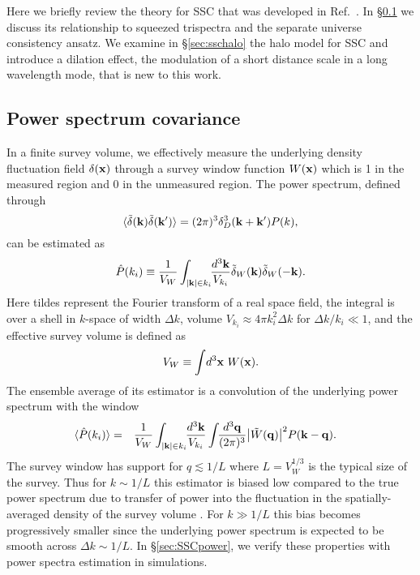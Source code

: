 \documentclass[prd,twocolumn,amsmath,amssymb,floatfix,superscriptaddress]{revtex4-1}
\newcommand{\bx}{{\bf x}}
\newcommand{\bk}{{\bf k}}
\newcommand{\bq}{{\bf q}}
\begin{document}
Here we briefly review the theory for SSC that was
developed in Ref.~\cite{Takada:2013wfa}.   In \S \ref{sec:ssctri} we discuss its relationship
to squeezed trispectra and the separate universe consistency ansatz.  We examine in \S \ref{sec:sschalo} the halo model for SSC and introduce a dilation effect, the modulation of  
a short distance scale in a long wavelength mode, that is new to this work.



\subsection{Power spectrum covariance}
\label{sec:ssctri}

In a finite survey volume, we effectively measure 
 the underlying density fluctuation field $\delta(\bx)$
through a survey window function $W(\bx)$ which is 1 in the measured
region and 0 in the unmeasured region.  
The power spectrum, defined through
\begin{equation}
\langle \tilde \delta(\bk ) \tilde \delta(\bk') \rangle = (2\pi)^3 \delta_D^3(\bk+\bk') P(k),
\end{equation}
can be estimated 
as
\begin{equation}
\hat P(k_i) \equiv \frac{1}{V_W} \int_{|\bk|\in k_i}\!\! \frac{d^3
 \bk}{V_{k_i}} 
\tilde\delta_W(\bk)\tilde\delta_W(-\bk).
\label{eq:ps_est}
\end{equation}
Here  tildes represent the Fourier transform of a real space field,
the integral is over a shell in $k$-space of width $\Delta k$,
volume $V_{k_i}\approx 4\pi k_i^2 \Delta k$ for $\Delta k /k_i \ll 1$, and
 the effective survey volume is defined as
%
\begin{equation}
 V_W\equiv \int\!d^3\bx~W(\bx).
\end{equation}
The ensemble average of its estimator is a convolution of the underlying power spectrum 
with the window
%
\begin{eqnarray}
\!\!\!\!\!\!
\langle \hat P(k_i) \rangle &=& \frac{1}{V_W}   \int_{|\bk|\in 
k_i}\!\! \frac{d^3 \bk}{V_{k_i}}  \int\!\! \frac{d^3 \bq}{(2\pi)^3}  
\big|\tilde{W}(\bq)\big|^2 P(\bk-\bq).
\label{eqn:Pwindowed}
\end{eqnarray}
%
The survey window has support for $q \lesssim 1/L$ where $L = V_W^{1/3}$ is the typical
size of the survey.   Thus
for $k \sim 1/L$ this estimator is biased low compared to the true power spectrum
due to transfer of power into the fluctuation in the spatially-averaged density of
the survey volume {\citep{Takahashietal:09}}.    For $k \gg 1/L$ this
bias becomes progressively smaller since the underlying power spectrum is expected to 
be smooth across $\Delta k \sim 1/L$.   In \S \ref{sec:SSCpower}, we verify these properties with power spectra estimation in
simulations.
\end{document}
